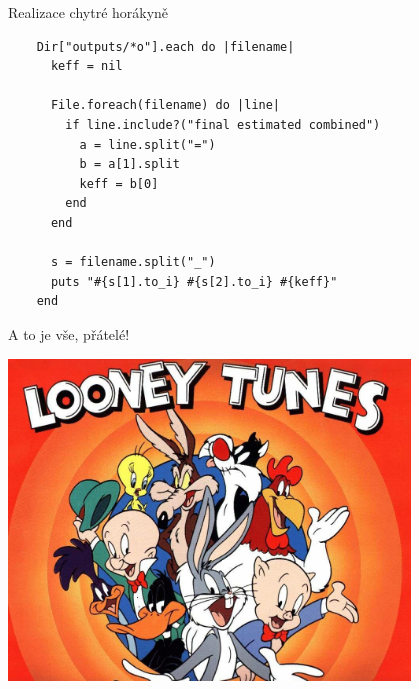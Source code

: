 \documentclass{beamer}
\begin{document}
\begin{frame}[fragile]{Realizace chytré horákyně}
  \scriptsize
  \begin{verbatim}
    Dir["outputs/*o"].each do |filename|
      keff = nil

      File.foreach(filename) do |line|
        if line.include?("final estimated combined")
          a = line.split("=")
          b = a[1].split
          keff = b[0]
        end
      end

      s = filename.split("_")
      puts "#{s[1].to_i} #{s[2].to_i} #{keff}"
    end
  \end{verbatim}
\end{frame}

\begin{frame}{A to je vše, přátelé!}
  \begin{center}
    \includegraphics[width=0.8\textwidth]{looney_tunes}
  \end{center}
\end{frame}
\end{document}
